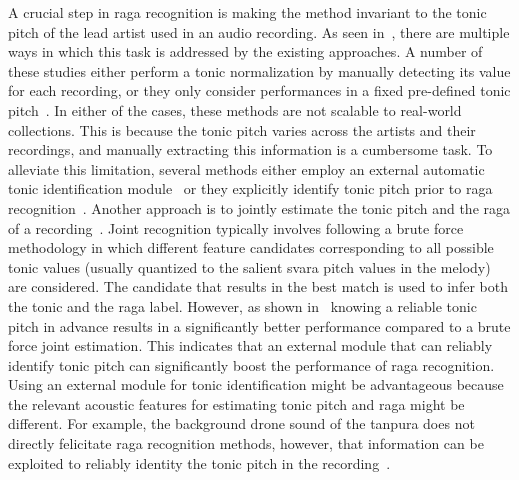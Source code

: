 A crucial step in \gls{raga} recognition is making the method invariant to the tonic pitch of the lead artist used in an audio recording. As seen in~, there are multiple ways in which this task is addressed by the existing approaches. A number of these studies either perform a tonic normalization by manually detecting its value for each recording, or they only consider performances in a fixed pre-defined tonic pitch~\citep{pandey2003tansen,chordia2007raag,belle2009raga,Shetty2009}. In either of the cases, these methods are not scalable to real-world collections. This is because the tonic pitch varies across the artists and their recordings, and manually extracting this information is a cumbersome task. To alleviate this limitation, several methods either employ an external automatic tonic identification module~\citep{koduri2012raga,koduri2014intonation} or they explicitly identify tonic pitch prior to \gls{raga} recognition~\citep{ranjani2011carnatic,chakraborty2012object}. Another approach is to jointly estimate the tonic pitch and the \gls{raga} of a recording~\cite{chordia2013joint,koduri2011survey,kumar2014identifying}. Joint recognition typically involves following a brute force methodology in which different feature candidates corresponding to all possible tonic values (usually quantized to the salient \gls{svara} pitch values in the melody) are considered. The candidate that results in the best match is used to infer both the tonic and the \gls{raga} label. However, as shown in~\cite{chordia2013joint} knowing a reliable tonic pitch in advance results in a significantly better performance compared to a brute force joint estimation. This indicates that an external module that can reliably identify tonic pitch can significantly boost the performance of \gls{raga} recognition. Using an external module for tonic identification might be advantageous because the relevant acoustic features for estimating tonic pitch and \gls{raga} might be different. For example, the background drone sound of the \gls{tanpura} does not directly felicitate \gls{raga} recognition methods, however, that information can be exploited to reliably identity the tonic pitch in the recording~\citep{Gulati2014Tonic}.

